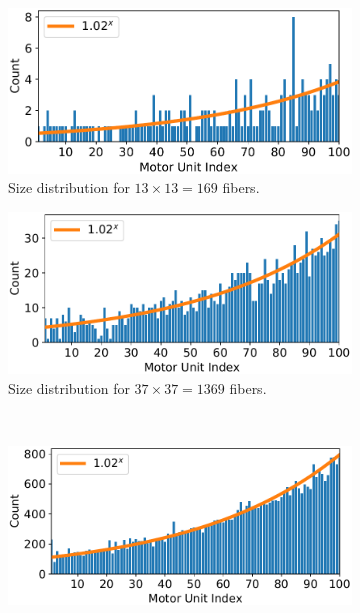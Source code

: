 \begin{figure}
  \centering%
  \begin{subfigure}[t]{0.45\textwidth}%
    \centering%
    \includegraphics[width=\textwidth]{images/results/application/MU_fibre_distribution_13x13_100mus_txt_fiber_distribution.pdf}%
    \caption{Size distribution for $13\times 13 = 169$ fibers.}%
    \label{fig:mus_13}%
  \end{subfigure} \quad
  \begin{subfigure}[t]{0.45\textwidth}%
    \centering%
    \includegraphics[width=\textwidth]{images/results/application/MU_fibre_distribution_37x37_100mus_txt_fiber_distribution.pdf}%
    \caption{Size distribution for $37\times 37 = 1369$ fibers.}%
    \label{fig:mus_37}%
  \end{subfigure}  \\
  \begin{subfigure}[t]{0.45\textwidth}%
    \centering%
    \includegraphics[width=\textwidth]{images/results/application/MU_fibre_distribution_187x187_100mus_txt_fiber_distribution.pdf}%

\end{subfigure}
\end{figure}
